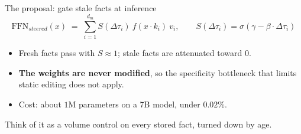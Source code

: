 \documentclass[aspectratio=169]{beamer}
\begin{document}
\begin{frame}{The proposal: gate stale facts at inference}
  \begin{equation*}
    \text{FFN}_{steered}(x) \;=\; \sum_{i=1}^{d_m} S(\Delta\tau_i)\ f(x \cdot k_i)\ v_i,
    \qquad
    S(\Delta\tau_i) = \sigma\!\left(\gamma - \beta \cdot \Delta\tau_i\right)
  \end{equation*}
  \vspace{0.5em}
  \begin{itemize}\setlength\itemsep{0.7em}
    \item Fresh facts pass with $S \approx 1$; stale facts are attenuated toward $0$.
    \item \textbf{The weights are never modified}, so the specificity bottleneck that
          limits static editing does not apply.
    \item Cost: about $1$M parameters on a 7B model, under $\mathbf{0.02\%}$.
  \end{itemize}
  \vspace{0.7em}
  \begin{center}\color{muted}\small
    Think of it as a volume control on every stored fact, turned down by age.
  \end{center}
\end{frame}
\end{document}
